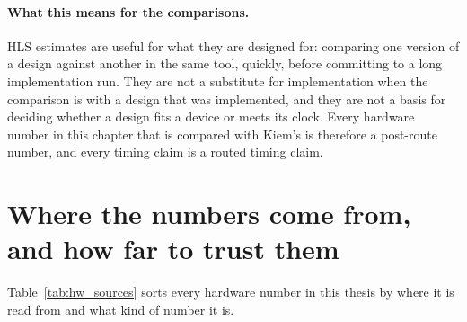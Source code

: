 \paragraph{What this means for the comparisons.} HLS estimates are useful for
what they are designed for: comparing one version of a design against another
in the same tool, quickly, before committing to a long implementation run. They
are not a substitute for implementation when the comparison is with a design
that was implemented, and they are not a basis for deciding whether a design
fits a device or meets its clock. Every hardware number in this chapter that is
compared with Kiem's is therefore a post-route number, and every timing claim is
a routed timing claim.

\section{Where the numbers come from, and how far to trust them}
\label{sec:hw_sources}

Table~\ref{tab:hw_sources} sorts every hardware number in this thesis by where
it is read from and what kind of number it is.

